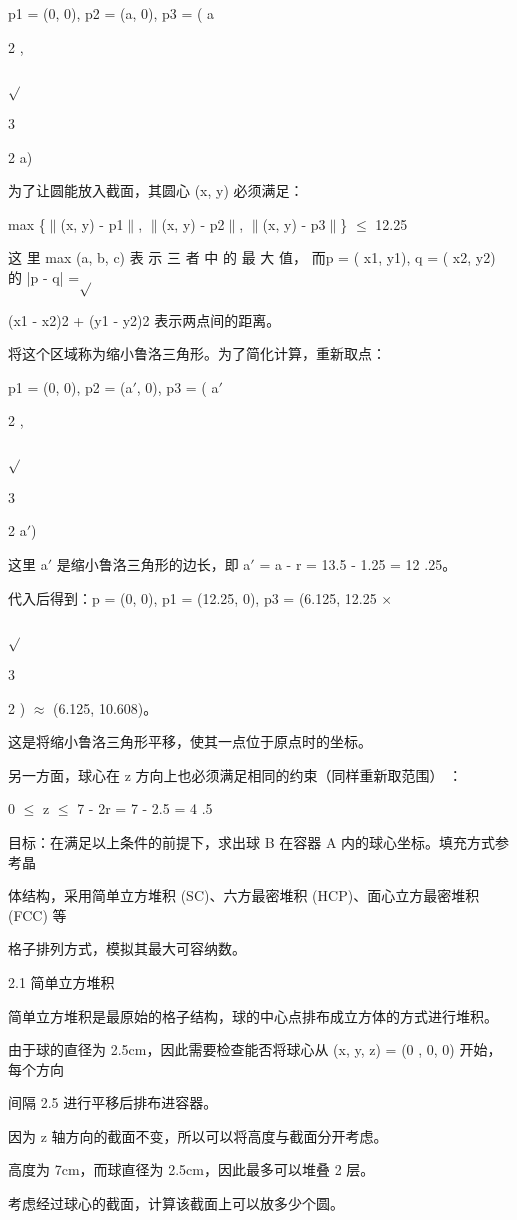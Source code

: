 p1 = (0, 0), p2 = (a, 0), p3 = ( a\par
2 ,\par
$\sqrt{}$\par
3\par
2 a)\par
为了让圆能放入截面，其圆心 (x, y) 必须满足：\par
max \{$\parallel$(x, y) - p1$\parallel$, $\parallel$(x, y) - p2$\parallel$, $\parallel$(x, y) - p3$\parallel$\} $\leq$ 12.25\par
这 里 max (a, b, c) 表 示 三 者 中 的 最 大 值， 而p = ( x1, y1), q = ( x2, y2) 的 |p - q| =$\sqrt{}$\par
(x1 - x2)2 + (y1 - y2)2 表示两点间的距离。\par
将这个区域称为缩小鲁洛三角形。为了简化计算，重新取点：\par
p1 = (0, 0), p2 = (a$\prime$, 0), p3 = ( a$\prime$\par
2 ,\par
$\sqrt{}$\par
3\par
2 a$\prime$)\par
这里 a$\prime$ 是缩小鲁洛三角形的边长，即 a$\prime$ = a - r = 13.5 - 1.25 = 12 .25。\par
代入后得到：p = (0, 0), p1 = (12.25, 0), p3 = (6.125, 12.25 $\times$\par
$\sqrt{}$\par
3\par
2 ) $\approx$ (6.125, 10.608)。\par
这是将缩小鲁洛三角形平移，使其一点位于原点时的坐标。\par
另一方面，球心在 z 方向上也必须满足相同的约束（同样重新取范围） ：\par
0 $\leq$ z $\leq$ 7 - 2r = 7 - 2.5 = 4 .5\par
目标：在满足以上条件的前提下，求出球 B 在容器 A 内的球心坐标。填充方式参考晶\par
体结构，采用简单立方堆积 (SC)、六方最密堆积 (HCP)、面心立方最密堆积 (FCC) 等\par
格子排列方式，模拟其最大可容纳数。\par
2.1 简单立方堆积\par
简单立方堆积是最原始的格子结构，球的中心点排布成立方体的方式进行堆积。\par
由于球的直径为 2.5cm，因此需要检查能否将球心从 (x, y, z) = (0 , 0, 0) 开始，每个方向\par
间隔 2.5 进行平移后排布进容器。\par
因为 z 轴方向的截面不变，所以可以将高度与截面分开考虑。\par
高度为 7cm，而球直径为 2.5cm，因此最多可以堆叠 2 层。\par
考虑经过球心的截面，计算该截面上可以放多少个圆。\par

